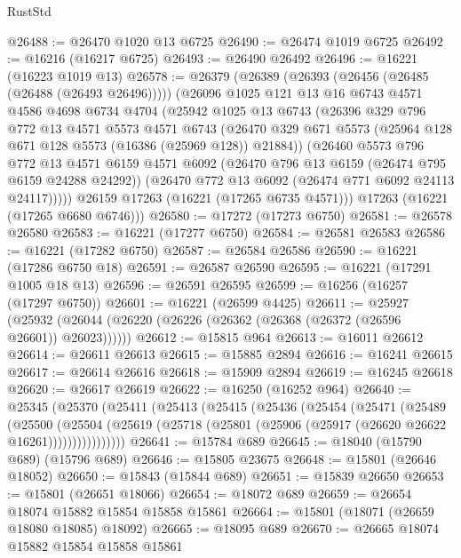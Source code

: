 \begin{lexlean}{RustStd}
\begin{coremodule}
@26488 := @26470 @1020 @13 @6725
@26490 := @26474 @1019 @6725
@26492 := @16216 (@16217 @6725)
@26493 := @26490 @26492
@26496 := @16221 (@16223 @1019 @13)
@26578 := @26379
    (@26389
      (@26393 (@26456 (@26485 (@26488 (@26493 @26496)))))
      (@26096
        @1025
        @121
        @13
        @16
        @6743
        @4571
        @4586
        @4698
        @6734
        @4704
        (@25942
          @1025
          @13
          @6743
          (@26396
            @329
            @796
            @772
            @13
            @4571
            @5573
            @4571
            @6743
            (@26470 @329 @671 @5573 (@25964 @128 @671 @128 @5573 (@16386 (@25969 @128)) @21884))
            (@26460
              @5573
              @796
              @772
              @13
              @4571
              @6159
              @4571
              @6092
              (@26470 @796 @13 @6159 (@26474 @795 @6159 @24288 @24292))
              (@26470 @772 @13 @6092 (@26474 @771 @6092 @24113 @24117)))))
        @26159
        @17263
        (@16221 (@17265 @6735 @4571)))
      @17263
      (@16221 (@17265 @6680 @6746)))
@26580 := @17272 (@17273 @6750)
@26581 := @26578 @26580
@26583 := @16221 (@17277 @6750)
@26584 := @26581 @26583
@26586 := @16221 (@17282 @6750)
@26587 := @26584 @26586
@26590 := @16221 (@17286 @6750 @18)
@26591 := @26587 @26590
@26595 := @16221 (@17291 @1005 @18 @13)
@26596 := @26591 @26595
@26599 := @16256 (@16257 (@17297 @6750))
@26601 := @16221 (@26599 @4425)
@26611 := @25927
    (@25932 (@26044 (@26220 (@26226 (@26362 (@26368 (@26372 (@26596 @26601)) @26023))))))
@26612 := @15815 @964
@26613 := @16011 @26612
@26614 := @26611 @26613
@26615 := @15885 @2894
@26616 := @16241 @26615
@26617 := @26614 @26616
@26618 := @15909 @2894
@26619 := @16245 @26618
@26620 := @26617 @26619
@26622 := @16250 (@16252 @964)
@26640 := @25345
    (@25370
      (@25411
        (@25413
          (@25415
            (@25436
              (@25454
                (@25471
                  (@25489
                    (@25500
                      (@25504
                        (@25619
                          (@25718 (@25801 (@25906 (@25917 (@26620 @26622 @16261))))))))))))))))
@26641 := @15784 @689
@26645 := @18040 (@15790 @689) (@15796 @689)
@26646 := @15805 @23675
@26648 := @15801 (@26646 @18052)
@26650 := @15843 (@15844 @689)
@26651 := @15839 @26650
@26653 := @15801 (@26651 @18066)
@26654 := @18072 @689
@26659 := @26654 @18074 @15882 @15854 @15858 @15861
@26664 := @15801 (@18071 (@26659 @18080 @18085) @18092)
@26665 := @18095 @689
@26670 := @26665 @18074 @15882 @15854 @15858 @15861

\end{coremodule}
\end{lexlean}
